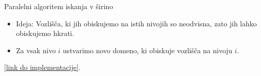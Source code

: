 \documentclass{beamer}
\begin{document}
\begin{frame}{Paralelni algoritem iskanja v širino}
    \begin{itemize}
        \item Ideja: Vozlišča, ki jih obiskujemo na istih nivojih so neodvisna, zato jih lahko obiskujemo hkrati.
        \item Za vsak nivo $i$ ustvarimo novo domeno, ki obiskuje vozlišča na nivoju $i$.
    \end{itemize}
    \href{https://github.com/tjazerzen/parallelisation-of-graph-algorithms-in-functional-programming-languages/blob/parallel_BFS/playground/graph/bfs.ml}{[link do implementacije]}.
\end{frame}
\end{document}
